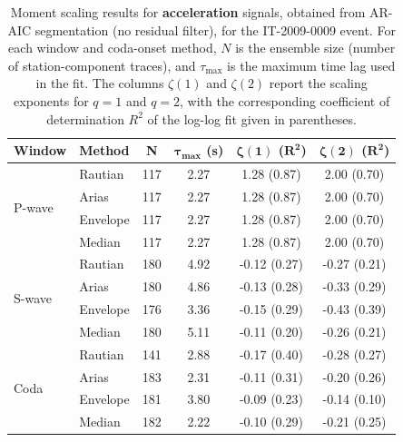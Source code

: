 \begin{table}[H]
\centering
\small
\begin{tabular}{llcccc}
\toprule
\textbf{Window} & \textbf{Method} & \textbf{N} & $\bm{\tau_{\max}}$ \textbf{(s)} & $\bm{\zeta(1)}$ \textbf{(}$\bm{R^2}$\textbf{)} & $\bm{\zeta(2)}$ \textbf{(}$\bm{R^2}$\textbf{)} \\
\midrule
\multirow{4}{*}{P-wave}
& Rautian & 117 & 2.27 & 1.28 (0.87) & 2.00 (0.70) \\
& Arias & 117 & 2.27 & 1.28 (0.87) & 2.00 (0.70) \\
& Envelope & 117 & 2.27 & 1.28 (0.87) & 2.00 (0.70) \\
& Median & 117 & 2.27 & 1.28 (0.87) & 2.00 (0.70) \\
\midrule
\multirow{4}{*}{S-wave}
& Rautian & 180 & 4.92 & -0.12 (0.27) & -0.27 (0.21) \\
& Arias & 180 & 4.86 & -0.13 (0.28) & -0.33 (0.29) \\
& Envelope & 176 & 3.36 & -0.15 (0.29) & -0.43 (0.39) \\
& Median & 180 & 5.11 & -0.11 (0.20) & -0.26 (0.21) \\
\midrule
\multirow{4}{*}{Coda}
& Rautian & 141 & 2.88 & -0.17 (0.40) & -0.28 (0.27) \\
& Arias & 183 & 2.31 & -0.11 (0.31) & -0.20 (0.26) \\
& Envelope & 181 & 3.80 & -0.09 (0.23) & -0.14 (0.10) \\
& Median & 182 & 2.22 & -0.10 (0.29) & -0.21 (0.25) \\
\bottomrule
\end{tabular}
\caption{Moment scaling results for \textbf{acceleration} signals, obtained from AR-AIC segmentation (no residual filter), for the IT-2009-0009 event. For each window and coda-onset method, $N$ is the ensemble size (number of station-component traces), and $\tau_{\max}$ is the maximum time lag used in the fit. The columns $\zeta(1)$ and $\zeta(2)$ report the scaling exponents for $q=1$ and $q=2$, with the corresponding coefficient of determination $R^2$ of the log-log fit given in parentheses.}
\label{tab:ar_aic_scaling_acc_nothresh_laquila}
\end{table}